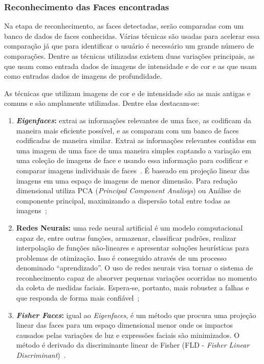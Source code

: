 \subsubsection{Reconhecimento das Faces encontradas}
\label{sec:reconhecimento}

	Na etapa de reconhecimento, as faces detectadas, serão comparadas com um banco
	de dados de faces conhecidas. Várias técnicas são usadas para acelerar essa
	comparação já que para identificar o usuário é necessário um grande número de
	comparações. Dentre as técnicas utilizadas existem duas variações principais, as
	que usam como entrada dados de imagens de intensidade e de cor e as que usam
	como entradas dados de imagens de profundidade.
	
	As técnicas que utilizam imagens de cor e de intensidade são as mais antigas e
	comuns e são amplamente utilizadas. Dentre elas destacam-se:
	
	\begin{enumerate}
		\item \textbf{\textit{Eigenfaces}:} extrai as informações relevantes de uma
		face, as codificam da maneira mais eficiente possível, e as comparam com um
		banco de faces codificadas de maneira similar. Extrai as informações relevantes contidas
		em uma imagem de uma face de uma maneira simples captando a variação em uma
		coleção de imagens de face e usando essa informação para codificar e comparar
		imagens individuais de faces~\cite{turk}. É baseado em projeção linear das
		imagens em uma espaço de imagens de menor dimensão. Para redução dimensional
		utiliza PCA (\textit{Principal Component Analisys}) ou Análise de componente
		principal, maximizando a dispersão total entre todas as
		imagens~\cite{belhumeur};
		
		\item \textbf{Redes Neurais:} uma rede neural artificial é um modelo
		computacional capaz de, entre outras funções, armazenar, classificar padrões,
		realizar interpolação de funções não-lineares e apresentar soluções heurísticas
		para problemas de otimização. Isso é conseguido através de um processo
		denominado ``aprendizado''. O uso de redes neurais visa tornar o sistema de
		reconhecimento capaz de absorver pequenas variações ocorridas no momento da
		coleta de medidas faciais. Espera-se, portanto,  mais robustez a falhas e que
		responda de forma mais confiável~\cite{oliveira};
		
		\item \textbf{\textit{Fisher Faces}:} igual ao \textit{Eigenfaces}, é um método
		que procura uma projeção linear das faces para um espaço dimensional menor onde
		os impactos causados pelas variações de luz e expressões faciais são
		minimizados. O método é derivado da discriminante linear de Fisher
		(FLD - \textit{Fisher Linear Discriminant})~\cite{belhumeur}.
	\end{enumerate}

